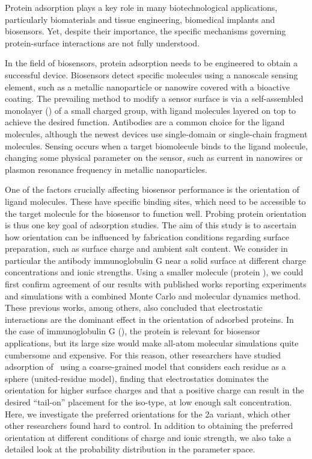 
Protein adsorption plays a key role in many biotechnological applications, particularly biomaterials and tissue engineering, biomedical implants and biosensors.
Yet, despite their importance, the specific mechanisms governing protein-surface interactions are not fully understood.\cite{Gray2004,RabeVerdesSeegel2011}

In the field of biosensors, protein adsorption needs to be engineered to obtain a successful device. 
Biosensors detect specific molecules using a nanoscale sensing element, such as a metallic nanoparticle or nanowire covered with a bioactive coating. 
The prevailing method to modify a sensor surface is via a self-assembled monolayer (\sam) of a small charged group, with ligand molecules layered on top to achieve the desired function. 
Antibodies are a common choice for the ligand molecules, although the newest devices use single-domain or single-chain fragment molecules.\cite{ByunETal2013,TrillingETal2014} 
Sensing occurs when a target biomolecule binds to the ligand molecule,  changing some physical parameter on the sensor, such as current in nanowires or plasmon resonance frequency in metallic nanoparticles. 

One of the factors crucially affecting biosensor performance is the orientation of ligand molecules.\cite{TajimaTakaiIshihara2011,TrillingBeekwilderZuilhof2013} 
These have specific binding sites, which need to be accessible to the target molecule for the biosensor to function well.
Probing protein orientation is thus one key goal of adsorption studies.
The aim of this study is to ascertain how orientation can be influenced by fabrication conditions regarding surface preparation, such as surface charge and ambient salt content. We consider in particular the antibody immunoglobulin G near a solid surface at different charge concentrations and ionic strengths. Using a smaller molecule (protein \gb), we could first confirm agreement of our results with published works reporting experiments\cite{BaioWeidnerBaughGambleStaytonCastner2012} and  simulations with a combined Monte Carlo and molecular dynamics method.\cite{LiuLiaoZhou2013} These previous works, among others, also concluded that electrostatic interactions are the dominant effect in the orientation of adsorbed proteins. In the case of immunoglobulin G (\ig), the protein is relevant for biosensor applications, but its large size would make all-atom molecular simulations quite cumbersome and expensive. For this reason, other researchers have studied adsorption of \ig\ using a coarse-grained model that considers each residue as a sphere (united-residue model),\cite{ZhouChenJiang2003} finding that electrostatics dominates the orientation for higher surface charges and that a positive charge can result in the desired ``tail-on'' placement for the  iso-type, at low enough salt concentration. 
Here, we investigate the preferred orientations for the \ig 2a variant, which other other researchers found hard to control.
In addition to obtaining the preferred orientation at different conditions of charge and ionic strength, we also take a detailed look at the probability distribution in the parameter space.

